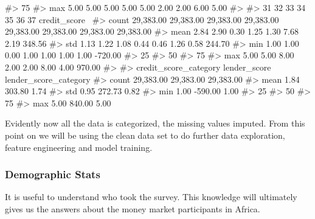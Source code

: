 \begin{Schunk}
\begin{Soutput}
#> 75%
#> max        5.00      5.00      5.00      5.00      5.00      2.00      2.00      6.00      5.00   
#> 
#>              31        32        33        34        35        36        37  credit_score  \
#> count 29,383.00 29,383.00 29,383.00 29,383.00 29,383.00 29,383.00 29,383.00     29,383.00   
#> mean       2.84      2.90      0.30      1.25      1.30      7.68      2.19        348.56   
#> std        1.13      1.22      1.08      0.44      0.46      1.26      0.58        244.70   
#> min        1.00      1.00      0.00      1.00      1.00      1.00      1.00       -720.00   
#> 25%
#> 50%
#> 75%
#> max        5.00      5.00      8.00      2.00      2.00      8.00      4.00        970.00   
#> 
#>        credit_score_category  lender_score  lender_score_category  
#> count              29,383.00     29,383.00              29,383.00  
#> mean                    1.84        303.80                   1.74  
#> std                     0.95        272.73                   0.82  
#> min                     1.00       -590.00                   1.00  
#> 25%
#> 50%
#> 75%
#> max                     5.00        840.00                   5.00
\end{Soutput}
\end{Schunk}

Evidently now all the data is categorized, the missing values imputed.
From this point on we will be using the clean data set to do further
data exploration, feature engineering and model training.

\hypertarget{demographic-stats}{%
\subsubsection{Demographic Stats}\label{demographic-stats}}

It is useful to understand who took the survey. This knowledge will
ultimately gives us the answers about the money market participants in
Africa.

